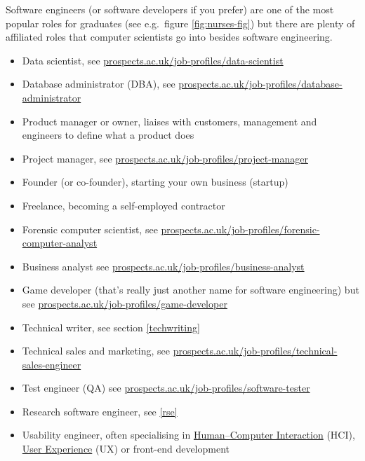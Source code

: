 \documentclass[
]{book}
\providecommand{\tightlist}{%
  \setlength{\itemsep}{0pt}\setlength{\parskip}{0pt}}
\begin{document}
Software engineers (or software developers if you prefer) are one of the most popular roles for graduates (see e.g.~figure \ref{fig:nurses-fig}) but there are plenty of affiliated roles that computer scientists go into besides software engineering.

\begin{itemize}
\tightlist
\item
  Data scientist, see \href{https://www.prospects.ac.uk/job-profiles/data-scientist}{prospects.ac.uk/job-profiles/data-scientist}
\item
  Database administrator (DBA), see \href{https://www.prospects.ac.uk/job-profiles/database-administrator}{prospects.ac.uk/job-profiles/database-administrator}
\item
  Product manager or owner, liaises with customers, management and engineers to define what a product does
\item
  Project manager, see \href{https://www.prospects.ac.uk/job-profiles/project-manager}{prospects.ac.uk/job-profiles/project-manager}
\item
  Founder (or co-founder), starting your own business (startup)
\item
  Freelance, becoming a self-employed contractor
\item
  Forensic computer scientist, see \href{https://www.prospects.ac.uk/job-profiles/forensic-computer-analyst}{prospects.ac.uk/job-profiles/forensic-computer-analyst}
\item
  Business analyst see \href{https://www.prospects.ac.uk/job-profiles/business-analyst}{prospects.ac.uk/job-profiles/business-analyst}
\item
  Game developer (that's really just another name for software engineering) but see \href{https://www.prospects.ac.uk/job-profiles/game-developer}{prospects.ac.uk/job-profiles/game-developer}
\item
  Technical writer, see section \ref{techwriting}
\item
  Technical sales and marketing, see \href{https://www.prospects.ac.uk/job-profiles/technical-sales-engineer}{prospects.ac.uk/job-profiles/technical-sales-engineer}
\item
  Test engineer (QA) see \href{https://www.prospects.ac.uk/job-profiles/software-tester}{prospects.ac.uk/job-profiles/software-tester}
\item
  Research software engineer, see \ref{rse}
\item
  Usability engineer, often specialising in \href{https://en.wikipedia.org/wiki/Human\%E2\%80\%93computer_interaction}{Human--Computer Interaction} (HCI), \href{https://en.wikipedia.org/wiki/User_experience}{User Experience} (UX) or front-end development

\end{itemize}
\end{document}
